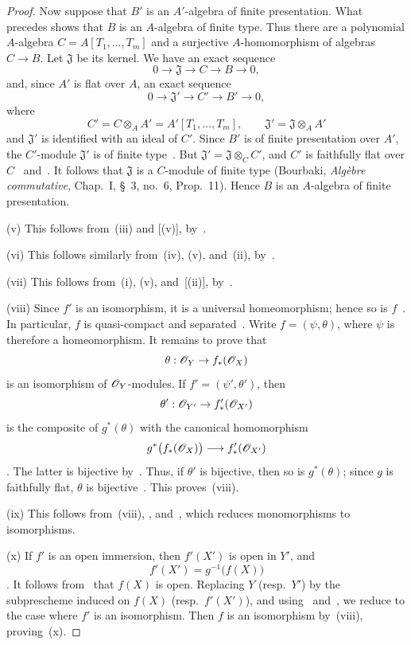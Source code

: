 \begin{proof}
Now suppose that $B'$ is an $A'$-algebra of finite presentation. What
precedes shows that $B$ is an $A$-algebra of finite type. Thus there
are a polynomial $A$-algebra $C=A[T_1,\ldots,T_m]$ and a surjective
$A$-homomorphism of algebras $C\to B$. Let $\mathfrak{J}$ be its
kernel. We have an exact sequence
\[
  0\to\mathfrak{J}\to C\to B\to0,
\]
and, since $A'$ is flat over $A$, an exact sequence
\[
  0\to\mathfrak{J}'\to C'\to B'\to0,
\]
where
\[
  C'=C\otimes_A A'=A'[T_1,\ldots,T_m],
  \qquad
  \mathfrak{J}'=\mathfrak{J}\otimes_A A'
\]
and $\mathfrak{J}'$ is identified with an ideal of $C'$. Since $B'$ is
of finite presentation over $A'$, the $C'$-module $\mathfrak{J}'$ is
of finite type~. But
$\mathfrak{J}'=\mathfrak{J}\otimes_C C'$, and $C'$ is faithfully flat
over $C$~ and~. It follows that
$\mathfrak{J}$ is a $C$-module of finite type
\textnormal{(}Bourbaki, \emph{Alg\`ebre commutative}, Chap.~I, \S~3,
no.~6, Prop.~11\textnormal{)}. Hence $B$ is an $A$-algebra of finite
presentation.

\textnormal{(v)} This follows from~\textnormal{(iii)} and
[(v)], by~.

\textnormal{(vi)} This follows similarly from~\textnormal{(iv)},
\textnormal{(v)}, and~\textnormal{(ii)}, by~.

\textnormal{(vii)} This follows from~\textnormal{(i)},
\textnormal{(v)}, and~[(ii)], by~.

\textnormal{(viii)} Since $f'$ is an isomorphism, it is a universal
homeomorphism; hence so is $f$~. In particular, $f$ is
quasi-compact and separated~. Write
$f=(\psi,\theta)$, where $\psi$ is therefore a homeomorphism. It remains
to prove that
\[
  \theta:\mathscr{O}_Y\to f_*(\mathscr{O}_X)
\]
is an isomorphism of $\mathscr{O}_Y$-modules. If
$f'=(\psi',\theta')$, then
\[
  \theta':\mathscr{O}_{Y'}\to f'_*(\mathscr{O}_{X'})
\]
is the composite of $g^*(\theta)$ with the canonical homomorphism
\[
  g^*\bigl(f_*(\mathscr{O}_X)\bigr)\longrightarrow f'_*(\mathscr{O}_{X'})
\]
. The latter is bijective by~. Thus,
if $\theta'$ is bijective, then so is $g^*(\theta)$; since $g$ is
faithfully flat, $\theta$ is bijective~. This
proves~\textnormal{(viii)}.

\textnormal{(ix)} This follows from~\textnormal{(viii)},
, and~, which reduces
monomorphisms to isomorphisms.

\textnormal{(x)} If $f'$ is an open immersion, then $f'(X')$ is open
in $Y'$, and
\[
  f'(X')=g^{-1}\bigl(f(X)\bigr)
\]
. It follows from~ that $f(X)$ is
open. Replacing $Y$ \textnormal{(}resp.\ $Y'$\textnormal{)} by the
subprescheme induced on $f(X)$ \textnormal{(}resp.\ $f'(X')$\textnormal{)},
and using~ and~, we reduce to the case
where $f'$ is an isomorphism. Then $f$ is an isomorphism
by~\textnormal{(viii)}, proving~\textnormal{(x)}.


\end{proof}
